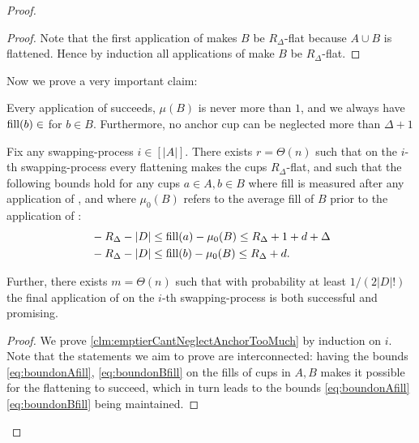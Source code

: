 \begin{proof}
\begin{proof}
  Note that the first application of \flatalg makes $B$ be
  $R_\Delta$-flat because $A\cup B$ is flattened. 
  Hence by induction all applications of \flatalg make $B$ be
  $R_\Delta$-flat.
\end{proof}



Now we prove a very important claim:
\begin{clm}
  \label{clm:emptierCantNeglectAnchorTooMuch}
  Every application of \flatalg succeeds, $\mu(B)$ is never
  more than $1$, and we always have $\operatorname{\textnormal{fill}}(b) \in $ for $b\in B$. 
  Furthermore, no anchor cup can be neglected more than $\Delta + 1$

  Fix any swapping-process $i \in [|A|]$. 
  There exists $r = \Theta(n)$ such that on the $i$-th swapping-process every
  flattening makes the cups $R_\Delta$-flat, and such that the
  following bounds hold for any cups $a\in A, b\in B$ where fill
  is measured after any application of \randalg, and where
  $\mu_0(B)$ refers to the average fill of $B$ prior to the
  application of \randalg:
  \begin{align}
    & - R_\Delta - |D| \le \operatorname{\textnormal{fill}}(a) -\mu_0(B) \le R_\Delta + 1 + d + \Delta \label{eq:boundonAfill}\\
    & - R_\Delta - |D| \le \operatorname{\textnormal{fill}}(b) - \mu_0(B) \le R_\Delta + d. \label{eq:boundonBfill}
  \end{align}

  Further, there exists $m=\Theta(n)$ such that with probability
  at least $1/(2|D|!)$ the final application of \randalg on the $i$-th
  swapping-process is both successful and promising.
\end{clm}
\begin{proof}

  We prove \cref{clm:emptierCantNeglectAnchorTooMuch} by
  induction on $i$. Note that the statements we aim to prove are
  interconnected: having the bounds \eqref{eq:boundonAfill},
  \eqref{eq:boundonBfill} on the fills of cups in $A, B$ makes it
  possible for the flattening to succeed, which in turn leads to
  the bounds \eqref{eq:boundonAfill} \eqref{eq:boundonBfill}
  being maintained.


\end{proof}
\end{proof}
